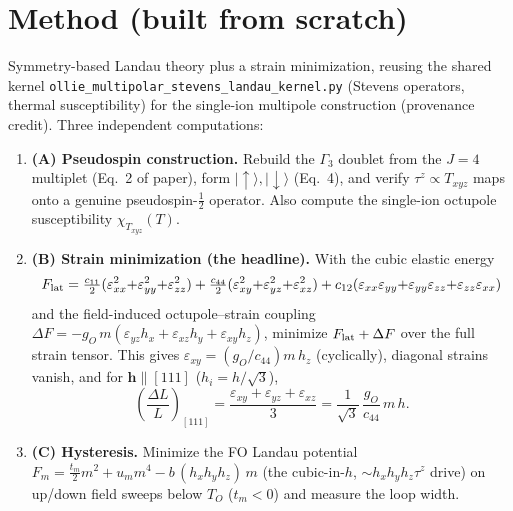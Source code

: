 \documentclass[11pt]{article}
\begin{document}
\section{Method (built from scratch)}
Symmetry-based Landau theory plus a strain minimization, reusing the shared
kernel \texttt{ollie\_multipolar\_stevens\_landau\_kernel.py} (Stevens operators,
thermal susceptibility) for the single-ion multipole construction (provenance
credit). Three independent computations:
\begin{enumerate}
\item \textbf{(A) Pseudospin construction.} Rebuild the $\Gamma_3$ doublet from
the $J=4$ multiplet (Eq.~2 of paper), form $|\!\uparrow\rangle,|\!\downarrow\rangle$
(Eq.~4), and verify $\tau^z\propto T_{xyz}$ maps onto a genuine pseudospin-$\tfrac12$
operator. Also compute the single-ion octupole susceptibility $\chi_{T_{xyz}}(T)$.
\item \textbf{(B) Strain minimization (the headline).} With the cubic elastic
energy
\begin{equation}
F_{\rm lat}=\tfrac{c_{11}}{2}(\varepsilon_{xx}^2{+}\varepsilon_{yy}^2{+}\varepsilon_{zz}^2)
+\tfrac{c_{44}}{2}(\varepsilon_{xy}^2{+}\varepsilon_{yz}^2{+}\varepsilon_{xz}^2)
+c_{12}(\varepsilon_{xx}\varepsilon_{yy}{+}\varepsilon_{yy}\varepsilon_{zz}{+}\varepsilon_{zz}\varepsilon_{xx})
\end{equation}
and the field-induced octupole--strain coupling
$\Delta F=-g_O\,m(\varepsilon_{yz}h_x+\varepsilon_{xz}h_y+\varepsilon_{xy}h_z)$,
minimize $F_{\rm lat}+\Delta F$ over the full strain tensor. This gives
$\varepsilon_{xy}=(g_O/c_{44})m\,h_z$ (cyclically), diagonal strains vanish, and
for $\mathbf{h}\parallel[111]$ ($h_i=h/\sqrt3$),
\begin{equation}
\left(\frac{\Delta L}{L}\right)_{[111]}=\frac{\varepsilon_{xy}+\varepsilon_{yz}+\varepsilon_{xz}}{3}
=\frac{1}{\sqrt3}\,\frac{g_O}{c_{44}}\,m\,h .
\end{equation}
\item \textbf{(C) Hysteresis.} Minimize the FO Landau potential
$F_m=\tfrac{t_m}{2}m^2+u_m m^4-b\,(h_xh_yh_z)\,m$ (the cubic-in-$h$, $\sim h_xh_yh_z\tau^z$
drive) on up/down field sweeps below $T_O$ ($t_m<0$) and measure the loop width.
\end{enumerate}
\end{document}
